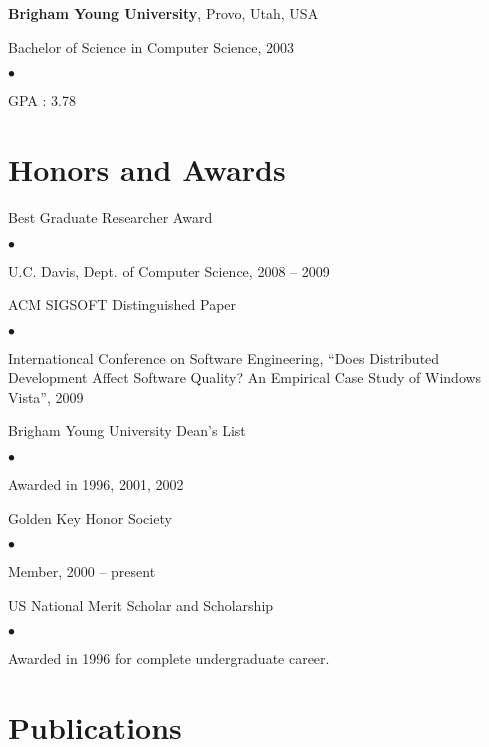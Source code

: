 \documentclass[margin,line,article]{res}
\newenvironment{list1}{
  \begin{list}{}{%
      \setlength{\itemsep}{0in}
      \setlength{\parsep}{0in} \setlength{\parskip}{0in}
      \setlength{\topsep}{0in} \setlength{\partopsep}{0in} 
      \setlength{\leftmargin}{0.17in}}}{\end{list}}
\newenvironment{list2}{
  \begin{list}{$\bullet$}{%
      \setlength{\itemsep}{0in}
      \setlength{\parsep}{0in} \setlength{\parskip}{0in}
      \setlength{\topsep}{0in} \setlength{\partopsep}{0in} 
      \setlength{\leftmargin}{0.2in}}}{\end{list}}
\begin{document}
\begin{resume}
\textbf{Brigham Young University}, Provo, Utah, USA
\begin{list1}
\item Bachelor of Science in Computer Science, 2003
\begin{list2}
\vspace*{.05in}
\item GPA : 3.78
\end{list2}
\end{list1}


\section{Honors and Awards} 

Best Graduate Researcher Award
\begin{list2}
\item U.C. Davis, Dept. of Computer Science, 2008 -- 2009
\end{list2}

ACM SIGSOFT Distinguished Paper
\begin{list2}
\item Internationcal Conference on Software Engineering, ``Does Distributed Development
Affect Software Quality?  An Empirical Case Study of Windows Vista'', 2009
\end{list2}

Brigham Young University Dean's List
\begin{list2}
\item Awarded in 1996, 2001, 2002
\end{list2}

Golden Key Honor Society
\begin{list2}
\item Member, 2000 -- present
\end{list2}

US National Merit Scholar and Scholarship
\begin{list2}
\item Awarded in 1996 for complete undergraduate career.
\end{list2}

\section{Publications}






\end{resume}
\end{document}
